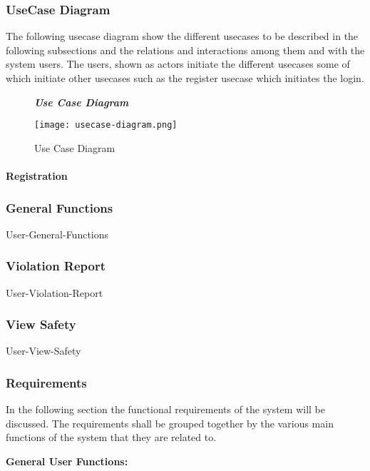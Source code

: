 \subsubsection{UseCase Diagram}
The following usecase diagram show the different usecases to be described in the following subsections and the relations and interactions among them and with the system users. The users, shown as actors initiate the different usecases some of which initiate other usecases such as the register usecase which initiates the login.

\begin{figure}[H]
\begin{flushleft}\emph{\textbf{Use Case Diagram}}\end{flushleft}
\caption{Use Case Diagram}
\label{usecase}
\centering
\texttt{[image: usecase-diagram.png]}
\end{figure}
\paragraph{Registration}
\hfill \break

\subsubsection{General Functions}

{User-General-Functions}

\subsubsection{Violation Report}

{User-Violation-Report}

\subsubsection{View Safety}

{User-View-Safety}

\subsubsection{Requirements}
In the following section the functional requirements of the system will be discussed. The requirements shall be grouped together by the various main functions of the system that they are related to.


\textbf{General User Functions:}

